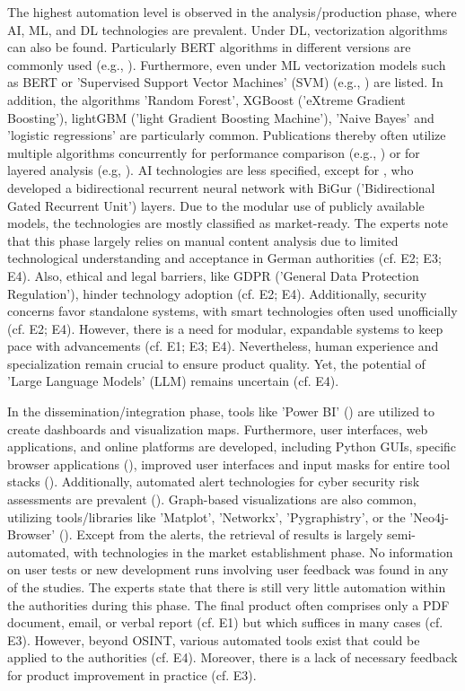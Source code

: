 \documentclass[10pt]{article}
\begin{document}
The highest automation level is observed in the analysis/production phase, where AI, ML, and DL technologies are prevalent.
Under DL, vectorization algorithms can also be found. Particularly BERT algorithms in different versions are commonly used
(e.g., \cite{Ma.2022}). Furthermore, even under ML vectorization models such as BERT or
'Supervised Support Vector Machines' (SVM) (e.g., \cite{Iorga.2020}) are listed.
In addition, the algorithms 'Random Forest', XGBoost ('eXtreme Gradient Boosting'),
lightGBM ('light Gradient Boosting Machine'), 'Naive Bayes' and 'logistic regressions' are particularly common.
Publications thereby often utilize multiple algorithms concurrently for performance comparison (e.g., \cite{Tao.2023})
or for layered analysis (e.g, \cite{Yang.2022}). AI technologies are less specified,
except for \textcite{Dale.2023}, who developed a bidirectional recurrent neural network with
BiGur ('Bidirectional Gated Recurrent Unit') layers. Due to the modular use of publicly available models,
the technologies are mostly classified as market-ready. The experts note that this phase largely relies
on manual content analysis due to limited technological understanding and acceptance in German authorities
(cf. E2; E3; E4). Also, ethical and legal barriers, like GDPR ('General Data Protection Regulation'), hinder technology
adoption (cf. E2; E4). Additionally, security concerns favor standalone systems,
with smart technologies often used unofficially (cf. E2; E4). However, there is a need for modular,
expandable systems to keep pace with advancements (cf. E1; E3; E4). Nevertheless, human experience
and specialization remain crucial to ensure product quality. Yet, the potential of 'Large Language Models' (LLM) remains uncertain (cf. E4).

In the dissemination/integration phase, tools like 'Power BI' (\cite{Tao.2023})
are utilized to create dashboards and visualization maps. Furthermore, user interfaces,
web applications, and online platforms are developed, including Python GUIs,
specific browser applications (\cite{Elmas.2022}),
improved user interfaces and input masks for entire tool stacks (\cite{Arjun.2020}).
Additionally, automated alert technologies for cyber security risk assessments are prevalent (\cite{Ahuja.2022}). Graph-based visualizations are also common, utilizing tools/libraries like 'Matplot', 'Networkx', 'Pygraphistry', or the 'Neo4j-Browser' (\cite{Middleton.2020}).
Except from the alerts, the retrieval of results is largely semi-automated, with technologies in the market establishment phase. No information on user tests or new development runs involving user feedback was found in any of the studies. The experts state that there is still very little
automation within the authorities during this phase. The final product often comprises only a PDF document, email, or verbal report (cf. E1) but which suffices in many cases (cf. E3).
However, beyond OSINT, various automated tools exist that could be applied to the authorities (cf. E4). Moreover, there is a lack of necessary feedback for product improvement in practice (cf. E3).
\end{document}
